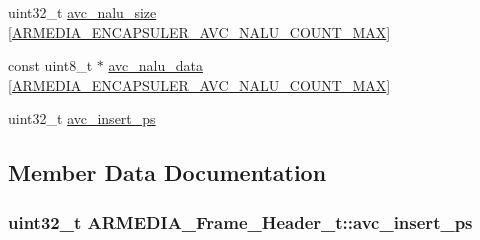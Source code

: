 \begin{DoxyCompactItemize}
\item 
uint32\+\_\+t \hyperlink{struct_a_r_m_e_d_i_a___frame___header__t_a39380a5261a1c09609aae11ea45c61b4}{avc\+\_\+nalu\+\_\+size} \mbox{[}\hyperlink{_a_r_m_e_d_i_a___video_encapsuler_8h_a6459506e9e8f0d872c445757f7509af4}{A\+R\+M\+E\+D\+I\+A\+\_\+\+E\+N\+C\+A\+P\+S\+U\+L\+E\+R\+\_\+\+A\+V\+C\+\_\+\+N\+A\+L\+U\+\_\+\+C\+O\+U\+N\+T\+\_\+\+M\+AX}\mbox{]}
\item 
const uint8\+\_\+t $\ast$ \hyperlink{struct_a_r_m_e_d_i_a___frame___header__t_a90c41a7da35eef48c2c0aa4eea634ea2}{avc\+\_\+nalu\+\_\+data} \mbox{[}\hyperlink{_a_r_m_e_d_i_a___video_encapsuler_8h_a6459506e9e8f0d872c445757f7509af4}{A\+R\+M\+E\+D\+I\+A\+\_\+\+E\+N\+C\+A\+P\+S\+U\+L\+E\+R\+\_\+\+A\+V\+C\+\_\+\+N\+A\+L\+U\+\_\+\+C\+O\+U\+N\+T\+\_\+\+M\+AX}\mbox{]}
\item 
uint32\+\_\+t \hyperlink{struct_a_r_m_e_d_i_a___frame___header__t_a435e9e99dae14c3f8b20341a8fc58613}{avc\+\_\+insert\+\_\+ps}
\end{DoxyCompactItemize}


\subsection{Member Data Documentation}
\subsubsection[{\texorpdfstring{avc\+\_\+insert\+\_\+ps}{avc_insert_ps}}]{\setlength{\rightskip}{0pt plus 5cm}uint32\+\_\+t A\+R\+M\+E\+D\+I\+A\+\_\+\+Frame\+\_\+\+Header\+\_\+t\+::avc\+\_\+insert\+\_\+ps}\hypertarget{struct_a_r_m_e_d_i_a___frame___header__t_a435e9e99dae14c3f8b20341a8fc58613}{}\label{struct_a_r_m_e_d_i_a___frame___header__t_a435e9e99dae14c3f8b20341a8fc58613}
